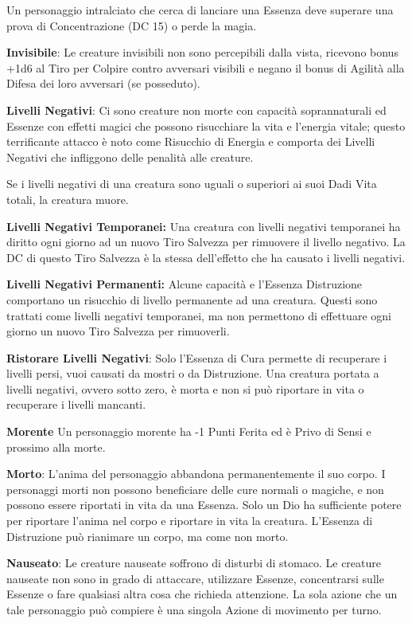 \documentclass[a4paper,11pt,twoside,openany]{book}
\begin{document}
{Un personaggio intralciato che cerca di lanciare una Essenza deve superare una prova di Concentrazione (DC 15) o perde la magia.

\textbf{Invisibile}: Le creature invisibili non sono percepibili dalla vista, ricevono bonus +1d6 al Tiro per Colpire contro avversari visibili e negano il bonus di Agilità alla Difesa dei loro avversari (se posseduto).

\textbf{Livelli Negativi}: Ci sono creature non morte con capacità soprannaturali ed Essenze con effetti magici che possono risucchiare la vita e l'energia vitale; questo terrificante attacco è noto come Risucchio di Energia e comporta dei Livelli Negativi che infliggono delle penalità alle creature.

Se i livelli negativi di una creatura sono uguali o superiori ai suoi Dadi Vita totali, la creatura muore.

\textbf{Livelli Negativi Temporanei:} Una creatura con livelli negativi temporanei ha diritto ogni giorno ad un nuovo Tiro Salvezza per rimuovere il livello negativo. La DC di questo Tiro Salvezza è la stessa dell'effetto che ha causato i livelli negativi.

\textbf{Livelli Negativi Permanenti:} Alcune capacità e l'Essenza Distruzione comportano un risucchio di livello permanente ad una creatura. Questi sono trattati come livelli negativi temporanei, ma non permettono di effettuare ogni giorno un nuovo Tiro Salvezza per rimuoverli. 

\textbf{Ristorare Livelli Negativi}: Solo l'Essenza di Cura permette di recuperare i livelli persi, vuoi causati da mostri o da Distruzione. Una creatura portata a livelli negativi, ovvero sotto zero, è morta e non si può riportare in vita o recuperare i livelli mancanti.

\textbf{Morente} Un personaggio morente ha -1 Punti Ferita ed è Privo di Sensi e prossimo alla morte.

\textbf{Morto}: L'anima del personaggio abbandona permanentemente il suo corpo. I personaggi morti non possono beneficiare delle cure normali o magiche, e non possono essere riportati in vita da una Essenza. Solo un Dio ha sufficiente potere per riportare l'anima nel corpo e riportare in vita la creatura. L'Essenza di Distruzione può rianimare un corpo, ma come non morto.

\textbf{Nauseato}: Le creature nauseate soffrono di disturbi di stomaco.
Le creature nauseate non sono in grado di attaccare, utilizzare Essenze, concentrarsi sulle Essenze o fare qualsiasi altra cosa che richieda attenzione. La sola azione che un tale personaggio può compiere è una singola Azione di movimento per turno.

}
\end{document}
